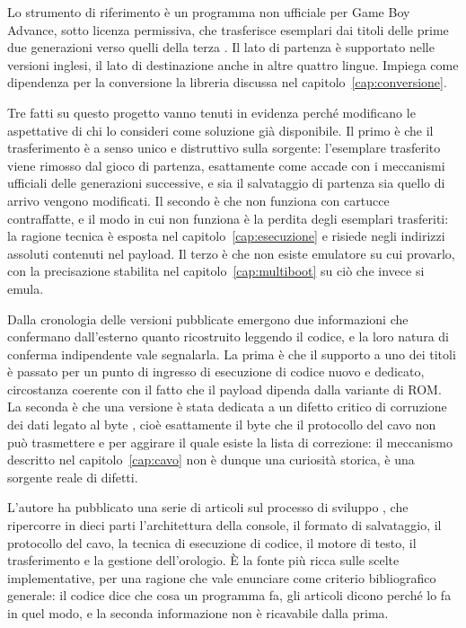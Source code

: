 Lo strumento di riferimento è un programma non ufficiale per Game Boy Advance, sotto licenza permissiva, che trasferisce esemplari dai titoli delle prime due generazioni verso quelli della terza \cite{ptgb}. Il lato di partenza è supportato nelle versioni inglesi, il lato di destinazione anche in altre quattro lingue. Impiega come dipendenza per la conversione la libreria discussa nel capitolo~\ref{cap:conversione}.

Tre fatti su questo progetto vanno tenuti in evidenza perché modificano le aspettative di chi lo consideri come soluzione già disponibile. Il primo è che il trasferimento è a senso unico e distruttivo sulla sorgente: l'esemplare trasferito viene rimosso dal gioco di partenza, esattamente come accade con i meccanismi ufficiali delle generazioni successive, e sia il salvataggio di partenza sia quello di arrivo vengono modificati. Il secondo è che non funziona con cartucce contraffatte, e il modo in cui non funziona è la perdita degli esemplari trasferiti: la ragione tecnica è esposta nel capitolo~\ref{cap:esecuzione} e risiede negli indirizzi assoluti contenuti nel payload. Il terzo è che non esiste emulatore su cui provarlo, con la precisazione stabilita nel capitolo~\ref{cap:multiboot} su ciò che invece si emula.

Dalla cronologia delle versioni pubblicate emergono due informazioni che confermano dall'esterno quanto ricostruito leggendo il codice, e la loro natura di conferma indipendente vale segnalarla. La prima è che il supporto a uno dei titoli è passato per un punto di ingresso di esecuzione di codice nuovo e dedicato, circostanza coerente con il fatto che il payload dipenda dalla variante di ROM. La seconda è che una versione è stata dedicata a un difetto critico di corruzione dei dati legato al byte , cioè esattamente il byte che il protocollo del cavo non può trasmettere e per aggirare il quale esiste la lista di correzione: il meccanismo descritto nel capitolo~\ref{cap:cavo} non è dunque una curiosità storica, è una sorgente reale di difetti.

L'autore ha pubblicato una serie di articoli sul processo di sviluppo \cite{devlog-ptgb}, che ripercorre in dieci parti l'architettura della console, il formato di salvataggio, il protocollo del cavo, la tecnica di esecuzione di codice, il motore di testo, il trasferimento e la gestione dell'orologio. È la fonte più ricca sulle scelte implementative, per una ragione che vale enunciare come criterio bibliografico generale: il codice dice che cosa un programma fa, gli articoli dicono perché lo fa in quel modo, e la seconda informazione non è ricavabile dalla prima.

